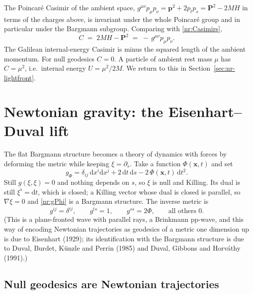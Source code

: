 The Poincar\'e Casimir of the ambient space,
$g^{\mu\nu}p_\mu p_\nu=\mathbf{p}^2+2p_tp_s=\mathbf{P}^2-2MH$ in terms of the
charges above, is invariant under the whole Poincar\'e group and in particular
under the Bargmann subgroup. Comparing with \eqref{nr:Casimirs},
\begin{equation}
  C\;=\;2MH-\mathbf{P}^2\;=\;-\,g^{\mu\nu}p_\mu p_\nu .
  \label{nr:CasimirAmbient}
\end{equation}
The Galilean internal-energy Casimir is minus the squared length of the
ambient momentum. For null geodesics $C=0$. A particle of ambient rest mass
$\mu$ has $C=\mu^2$, i.e.\ internal energy $U=\mu^2/2M$. We return to this in
Section~\ref{sec:nr-lightfront}.

\section{Newtonian gravity: the Eisenhart--Duval lift}
\label{sec:nr-gravity}

The flat Bargmann structure becomes a theory of dynamics with forces by
deforming the metric while keeping $\xi=\partial_s$. Take a function
$\Phi(\mathbf{x},t)$ and set
\begin{equation}
  g_\Phi=\delta_{ij}\,\mathrm{d}x^i\mathrm{d}x^j+2\,\mathrm{d}t\,\mathrm{d}s
        -2\,\Phi(\mathbf{x},t)\,\mathrm{d}t^2 .
  \label{nr:gPhi}
\end{equation}
Still $g(\xi,\xi)=0$ and nothing depends on $s$, so $\xi$ is null and Killing. Its
dual is still $\xi^\flat=\mathrm{d}t$, which is closed; a Killing vector whose
dual is closed is parallel, so $\nabla\xi=0$ and \eqref{nr:gPhi} is a
Bargmann structure. The inverse metric is
\begin{equation}
  g^{ij}=\delta^{ij},\qquad g^{ts}=1,\qquad g^{ss}=2\Phi,\qquad
  \text{all others }0 .
  \label{nr:ginv}
\end{equation}
(This is a plane-fronted wave with parallel rays, a Brinkmann pp-wave, and
this way of encoding Newtonian trajectories as geodesics of a metric one
dimension up is due to Eisenhart (1929); its identification with the Bargmann
structure is due to Duval, Burdet, K\"unzle and Perrin (1985) and
Duval, Gibbons and Horv\'athy (1991).)

\subsection{Null geodesics are Newtonian trajectories}

